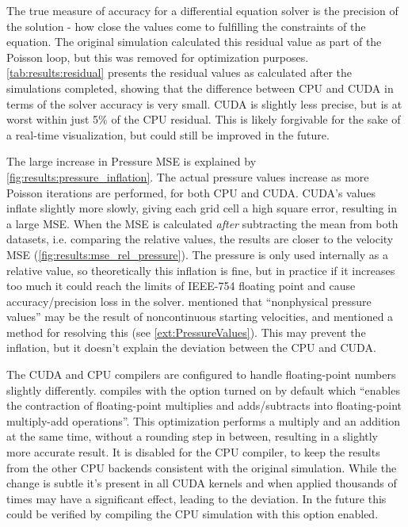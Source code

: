 

The true measure of accuracy for a differential equation solver is the precision of the solution - how close the values come to fulfilling the constraints of the equation.
The original simulation calculated this residual value as part of the Poisson loop, but this was removed for optimization purposes.
\cref{tab:results:residual} presents the residual values as calculated after the simulations completed, showing that the difference between CPU and CUDA in terms of the solver accuracy is very small.
CUDA is slightly less precise, but is at worst within just 5\% of the CPU residual.
This is likely forgivable for the sake of a real-time visualization, but could still be improved in the future.




The large increase in Pressure MSE is explained by \cref{fig:results:pressure_inflation}.
The actual pressure values increase as more Poisson iterations are performed, for both CPU and CUDA.
CUDA's values inflate slightly more slowly, giving each grid cell a high square error, resulting in a large MSE.
When the MSE is calculated \emph{after} subtracting the mean from both datasets, i.e. comparing the relative values, the results are closer to the velocity MSE (\cref{fig:results:mse_rel_pressure}).
The pressure is only used internally as a relative value, so theoretically this inflation is fine, but in practice if it increases too much it could reach the limits of IEEE-754 floating point\cite{IEEEFloat75419} and cause accuracy/precision loss in the solver.
\cite{book:griebel1998numerical} mentioned that ``nonphysical pressure values'' may be the result of noncontinuous starting velocities, and mentioned a method for resolving this (see \cref{ext:PressureValues}). This may prevent the inflation, but it doesn't explain the deviation between the CPU and CUDA.

The CUDA and CPU compilers are configured to handle floating-point numbers slightly differently.
 compiles with the  option turned on by default\cite{NvccFmad} which ``enables the contraction of floating-point multiplies and adds/subtracts into floating-point multiply-add operations''.
This optimization performs a multiply and an addition at the same time, without a rounding step in between, resulting in a slightly more accurate result\cite{NvidiaFMAJustification}.
It is disabled for the CPU compiler, to keep the results from the other CPU backends consistent with the original simulation.
While the change is subtle it's present in all CUDA kernels and when applied thousands of times may have a significant effect, leading to the deviation.
In the future this could be verified by compiling the CPU simulation with this option enabled.

